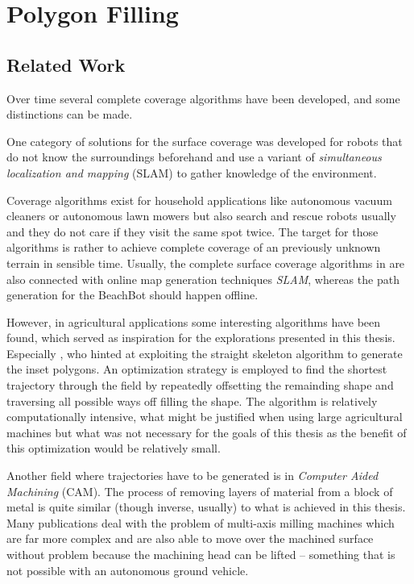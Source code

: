 \section{Polygon Filling}

\subsection{Related Work}

Over time several complete coverage algorithms have been developed, and some distinctions can be made. 

One category of solutions for the surface coverage  was developed for robots that do not know the surroundings beforehand and use a variant of \textit{simultaneous localization and mapping} (SLAM) to gather knowledge of the environment. 

Coverage algorithms exist for household applications like autonomous vacuum cleaners or autonomous lawn mowers but also search and rescue robots usually and they  do not care if they visit the same spot twice. The target for those algorithms is rather to achieve complete coverage of an previously unknown terrain in sensible time. Usually, the complete surface coverage algorithms in are also connected with online map generation techniques \textit{SLAM}, whereas the path generation for the BeachBot should happen offline.

However, in agricultural applications some interesting algorithms have been found, which served as inspiration for the explorations presented in this thesis. Especially \citep{ROB:ROB20300}, who hinted at exploiting the straight skeleton algorithm to generate the inset polygons. An optimization strategy is employed to find the shortest trajectory through the field by repeatedly offsetting the remainding shape and traversing all possible ways off filling the shape. The algorithm is relatively computationally intensive, what might be justified when using large agricultural machines but what was not necessary for the goals of this thesis as the benefit of this optimization would be relatively small.

Another field where trajectories have to be generated is in \textit{Computer Aided Machining} (CAM). The process of removing layers of material from a block of metal is quite similar (though inverse, usually) to what is achieved in this thesis. Many publications deal with the problem of multi-axis milling machines which are far more complex and are also able to move over the machined surface without problem because the machining head can be lifted -- something that is not possible with an autonomous ground vehicle.

